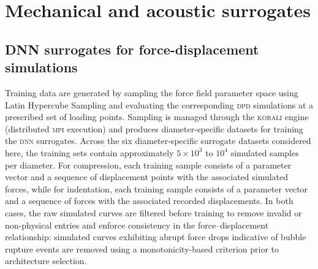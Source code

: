 \documentclass[%
 aip,
 jcp,
 amsmath,amssymb,
 preprint,%
]{revtex4-1}
\begin{document}
\section{Mechanical and acoustic surrogates}
\label{app:surrogate}

\subsection{DNN surrogates for force-displacement simulations}
Training data are generated by sampling the force field parameter space using Latin Hypercube Sampling \cite{joseph2020designing} and evaluating the corresponding \textsc{dpd} simulations at a prescribed set of loading points. Sampling is managed through the \textsc{korali} engine (distributed \textsc{mpi} execution) and produces diameter-specific datasets for training the \textsc{dnn} surrogates. Across the six diameter-specific surrogate datasets considered here, the training sets contain approximately $5\times10^3$ to $10^4$ simulated samples per diameter. For compression, each training sample consists of a parameter vector and a sequence of displacement points with the associated simulated forces, while for indentation, each training sample consists of a parameter vector and a sequence of forces with the associated recorded displacements. In both cases, the raw simulated curves are filtered before training to remove invalid or non-physical entries and enforce consistency in the force--displacement relationship: simulated curves exhibiting abrupt force drops indicative of bubble rupture events are removed using a monotonicity-based criterion prior to architecture selection. \\
\end{document}
